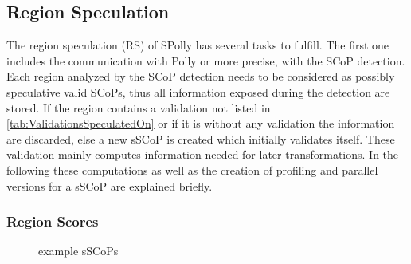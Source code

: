 \begin{shaded}

\subsection{Region Speculation}
The region speculation (RS) of SPolly has several tasks to fulfill. The first 
one includes the communication with Polly or more precise, 
with the SCoP detection. Each region analyzed by the SCoP detection needs to be
considered as possibly speculative valid SCoPs, thus all information exposed 
during the detection are stored. If the region contains a validation not 
listed in \ref{tab:ValidationsSpeculatedOn} or if it is without any validation
the information are discarded, else a new sSCoP is created which initially 
validates itself. These validation mainly computes information needed for later
transformations. In the following these computations as well as the creation of 
profiling and parallel versions for a sSCoP are explained briefly.


\subsubsection{Region Scores}

\lstset{frame=none}
\begin{figure}
  \centering


  \caption{example sSCoPs}
  \label{fig:ScoredSCoPs}
\end{figure}
\resetlst


\end{shaded}
